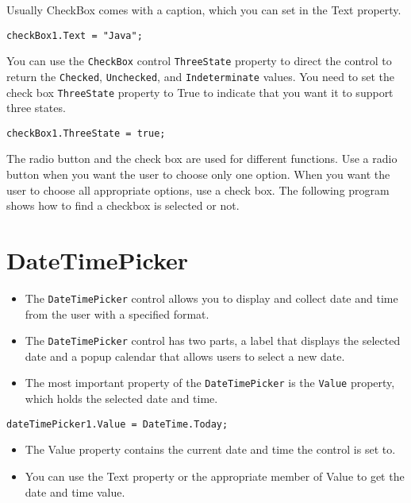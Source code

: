 Usually CheckBox comes with a caption, which you can set in the Text property.

\begin{lstlisting}[numbers=none]
	checkBox1.Text = "Java";
\end{lstlisting}

You can use the \texttt{CheckBox} control \texttt{ThreeState} property to direct the control to return the \texttt{Checked}, \texttt{Unchecked}, and \texttt{Indeterminate} values. You need to set the check box \texttt{ThreeState} property to True to indicate that you want it to support three states.

\begin{lstlisting}[numbers=none]
	checkBox1.ThreeState = true;
\end{lstlisting}

The radio button and the check box are used for different functions. Use a radio button when you want the user to choose only one option. When you want the user to choose all appropriate options, use a check box. The following {\cs} program shows how to find a checkbox is selected or not.




\section{DateTimePicker}
\begin{itemize}
	\item The \texttt{DateTimePicker} control allows you to display and collect date and time from the user with a specified format.
	\item The \texttt{DateTimePicker} control has two parts, a label that displays the selected date and a popup calendar that allows users to select a new date. 
	\item The most important property of the \texttt{DateTimePicker} is the \texttt{Value} property, which holds the selected date and time.
\end{itemize}

\begin{lstlisting}[numbers=none]
	dateTimePicker1.Value = DateTime.Today;
\end{lstlisting}

\begin{itemize}
	\item The Value property contains the current date and time the control is set to. 
	\item You can use the Text property or the appropriate member of Value to get the date and time value.
\end{itemize}



